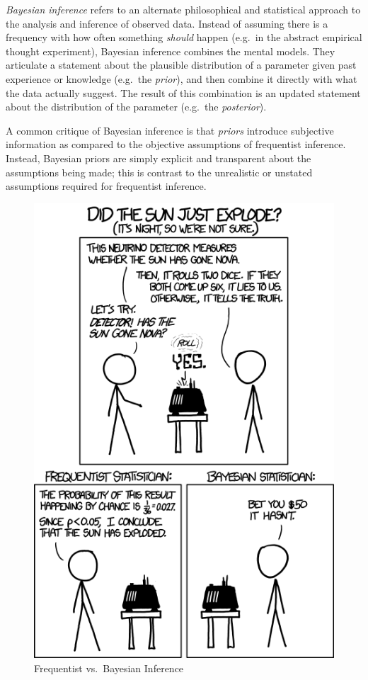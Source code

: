 \documentclass[
]{book}
\begin{document}
\emph{Bayesian inference} refers to an alternate philosophical and statistical approach to the analysis and inference of observed data. Instead of assuming there is a frequency with how often something \emph{should} happen (e.g.~in the abstract empirical thought experiment), Bayesian inference combines the mental models. They articulate a statement about the plausible distribution of a parameter given past experience or knowledge (e.g.~the \emph{prior}), and then combine it directly with what the data actually suggest. The result of this combination is an updated statement about the distribution of the parameter (e.g.~the \emph{posterior}).

A common critique of Bayesian inference is that \emph{priors} introduce subjective information as compared to the objective assumptions of frequentist inference. Instead, Bayesian priors are simply explicit and transparent about the assumptions being made; this is contrast to the unrealistic or unstated assumptions required for frequentist inference.

\begin{figure}
\centering
\includegraphics{images/frequentists_vs_bayesians.png}
\caption{\label{fig:unnamed-chunk-179}Frequentist vs.~Bayesian Inference}
\end{figure}
\end{document}
